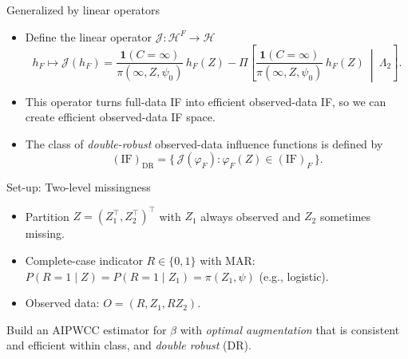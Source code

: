\documentclass[xcolor=dvipsnames,aspectratio=169]{beamer}
\newcommand{\1}{\mathbbm{1}}
\begin{document}
\begin{frame}{Generalized by linear operators}
    \begin{tcolorbox}[colframe=red,title=Definition 1]
    \begin{itemize}
      \item Define the linear operator $\mathcal{J}:\mathcal{H}^F\to\mathcal{H}$
      \[
        h_F \mapsto 
        \mathcal{J}
        (h_F) =
        \frac{\mathbf{1}(C=\infty)}{\pi(\infty,Z,\psi_0)}\,h_F(Z)
        - \Pi\!\left[
          \frac{\mathbf{1}(C=\infty)}{\pi(\infty,Z,\psi_0)}\,h_F(Z)
          \ \middle|\ \Lambda_2
        \right].
      \]
    \end{itemize}
  \end{tcolorbox}
  \begin{itemize}
    \item This operator turns full-data IF into efficient observed-data IF, so we can create efficient observed-data IF space.
  \end{itemize}
  \begin{tcolorbox}[colframe=red,title=Definition 2]
    \begin{itemize}
      \item The class of \emph{double-robust} observed-data influence functions is defined by
      \[
        (\mathrm{IF})_{\mathrm{DR}}
        =
        \big\{\, \mathcal{J}(\varphi_F): \varphi_F(Z)\in(\mathrm{IF})_F \,\big\}.
      \]
    \end{itemize}
  \end{tcolorbox}
\end{frame}


\begin{frame}{Set-up: Two-level missingness}
  \begin{itemize}
    \item Partition $Z=(Z_1^\top,Z_2^\top)^\top$ with $Z_1$ always observed and $Z_2$ sometimes missing.
    \item Complete-case indicator $R\in\{0,1\}$ with MAR: $P(R=1\mid Z)=P(R=1\mid Z_1)=\pi(Z_1,\psi)$ (e.g., logistic).
    \item Observed data: $O=(R, Z_1, RZ_2)$.
  \end{itemize}
  \vspace{4pt}
  \begin{tcolorbox}[title=Goal]
    Build an AIPWCC estimator for $\beta$ with \emph{optimal augmentation}
    that is consistent and efficient within class, and \emph{double robust} (DR).
  \end{tcolorbox}
\end{frame}
\end{document}
